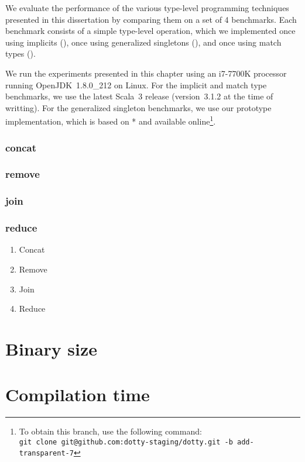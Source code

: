We evaluate the performance of the various type-level programming techniques presented in this dissertation by comparing them on a set of 4 benchmarks.
Each benchmark consists of a simple type-level operation, which we implemented once using implicits (), once using generalized singletons (), and once using match types ().

We run the experiments presented in this chapter using an i7-7700K processor running OpenJDK~1.8.0\_212 on Linux.
For the implicit and match type benchmarks, we use the latest Scala~3 release (version~3.1.2 at the time of writting).
For the generalized singleton benchmarks, we use our prototype implementation, which is based on * and available online\footnote{To obtain  this branch, use the following command: \\\texttt{git clone git@github.com:dotty-staging/dotty.git -b add-transparent-7}}.

\subsubsection{concat}
\subsubsection{remove}
\subsubsection{join}
\subsubsection{reduce}

\begin{enumerate}
  \item Concat
  \item Remove
  \item Join
  \item Reduce
\end{enumerate}

\section{Binary size}

\section{Compilation time}

